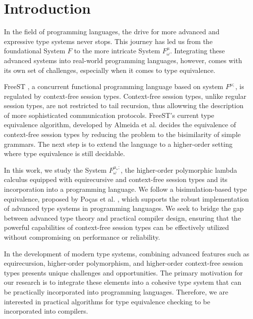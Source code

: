 \section{Introduction}
In the field of programming languages, the drive for more advanced and expressive type systems never stops. This journey has led us from the foundational System $F$\cite{DBLP:conf/programm/Reynolds74} to the more intricate System $F^{\mu}_\omega$\cite{DBLP:conf/popl/CaiGO16}. Integrating these advanced systems into real-world programming languages, however, comes with its own set of challenges, especially when it comes to type equivalence.

FreeST \cite{AlmeidaMTV22}, a concurrent functional programming language based on system $F^{\mu;}$, is regulated by context-free session types. Context-free session types, unlike regular session types, are not restricted to tail recursion, thus allowwing the description of more sophisticated communication protocols. FreeST's current type equivalence algorithm, developed by Almeida et al. \cite{AlmeidaMV20} decides the equivalence of context-free session types by reducing the problem to the bisimilarity of simple grammars. The next step is to extend the language to a higher-order setting where type equivalence is still decidable.


In this work, we study the System $F^{\mu_*;}_\omega$, the higher-order polymorphic lambda calculus equipped with equirecursive and context-free session types and its incorporation into a programming language. We follow a bisimulation-based type equivalence, proposed by Poças et al. \cite{PocasCMV23}, which supports the robust implementation of advanced type systems in programming languages. We seek to bridge the gap between advanced type theory and practical compiler design, ensuring that the powerful capabilities of context-free session types can be effectively utilized without compromising on performance or reliability.

In the development of modern type systems, combining advanced features such as equirecursion, higher-order polymorphism, and higher-order context-free session types presents unique challenges and opportunities. The primary motivation for our research is to integrate these elements into a cohesive type system that can be practically incorporated into programming languages. Therefore, we are interested in practical algorithms for type equivalence checking to be incorporated into compilers.

